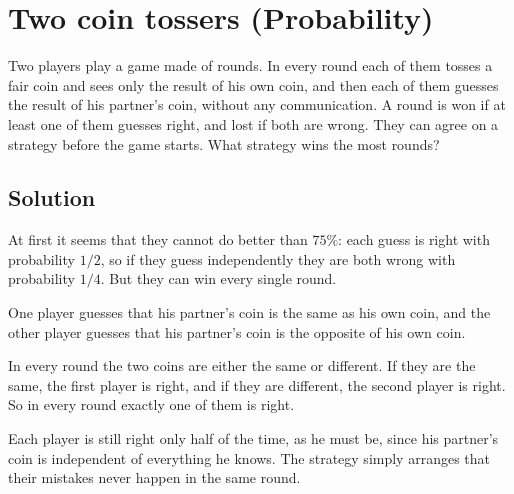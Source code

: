 \section {Two coin tossers (Probability)}

Two players play a game made of rounds. In every round each of them tosses a fair coin and sees only the result of his own coin,
and then each of them guesses the result of his partner's coin, without any communication.
A round is won if at least one of them guesses right, and lost if both are wrong.
They can agree on a strategy before the game starts. What strategy wins the most rounds?

\subsection{Solution}

At first it seems that they cannot do better than $75\%$: each guess is right with probability $1/2$, so if they guess independently
they are both wrong with probability $1/4$. But they can win every single round.

One player guesses that his partner's coin is the same as his own coin, and the other player guesses that his partner's coin is the opposite of his own coin.

In every round the two coins are either the same or different. If they are the same, the first player is right, and if they are different, the second player is right.
So in every round exactly one of them is right.

Each player is still right only half of the time, as he must be, since his partner's coin is independent of everything he knows.
The strategy simply arranges that their mistakes never happen in the same round.
